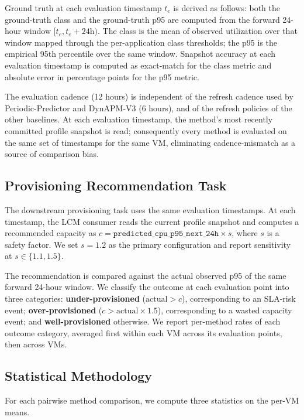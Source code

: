 \documentclass[manuscript,screen,review,anonymous]{acmart}
\begin{document}
Ground truth at each evaluation timestamp $t_e$ is derived as
follows: both the ground-truth class and the ground-truth p95 are
computed from the forward 24-hour window
$[t_e, t_e + 24\mathrm{h})$. The class is the mean of observed
utilization over that window mapped through the per-application
class thresholds; the p95 is the empirical 95th percentile over
the same window. Snapshot accuracy at each evaluation
timestamp is computed as exact-match for the class metric and
absolute error in percentage points for the p95 metric.

The evaluation cadence (12 hours) is independent of the refresh
cadence used by Periodic-Predictor and DynAPM-V3 (6 hours), and
of the refresh policies of the other baselines. At each
evaluation timestamp, the method's most recently committed
profile snapshot is read; consequently every method is evaluated
on the same set of timestamps for the same VM, eliminating
cadence-mismatch as a source of comparison bias.

\subsection{Provisioning Recommendation Task}\label{sec:setup-provisioning}

The downstream provisioning task uses the same evaluation
timestamps. At each timestamp, the LCM consumer reads the
current profile snapshot and computes a recommended capacity as
$c = \texttt{predicted\_cpu\_p95\_next\_24h} \times s$, where $s$
is a safety factor. We set $s = 1.2$ as the primary configuration
and report sensitivity at $s \in \{1.1, 1.5\}$.

The recommendation is compared against the actual observed p95
of the same forward 24-hour window. We classify the outcome at
each evaluation point into three categories:
\textbf{under-provisioned} ($\mathrm{actual} > c$), corresponding
to an SLA-risk event; \textbf{over-provisioned}
($c > \mathrm{actual} \times 1.5$), corresponding to a wasted
capacity event; and \textbf{well-provisioned} otherwise. We
report per-method rates of each outcome category, averaged first
within each VM across its evaluation points, then across VMs.

\subsection{Statistical Methodology}\label{sec:setup-statistics}

For each pairwise method comparison, we compute three statistics
on the per-VM means.
\end{document}

